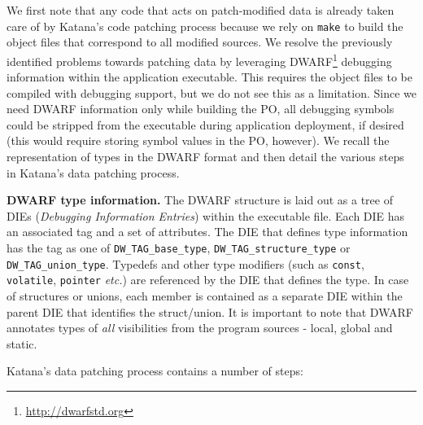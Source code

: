 We first note that any code that acts on patch-modified data is
already taken care of by Katana's code patching process
because we rely on {\tt make} to build the object files that
correspond to all modified sources. We resolve the previously
identified problems towards patching data by leveraging
DWARF\footnote{\url{http://dwarfstd.org}} debugging information within the
application executable. This requires the object files to be compiled
with debugging support, but we do not see this as a limitation. Since
we need DWARF information only while building the PO, all debugging
symbols could be stripped from the executable during application
deployment, if desired 
(this would require storing symbol values in the PO, however).
We recall the representation of types in
the DWARF format and then detail the various steps in Katana's data
patching process.

{\bf DWARF type information.} %
The DWARF structure is laid
out as a tree of DIEs ({\it Debugging Information Entries}) within the
executable file. Each DIE has an associated tag and a set of
attributes. The DIE that defines type information has the tag as one
of {\tt DW\_TAG\_base\_type}, {\tt DW\_TAG\_structure\_type} or {\tt
  DW\_TAG\_union\_type}. Typedefs and other type modifiers (such as
{\tt const}, {\tt volatile}, {\tt pointer} {\it etc.}) are referenced
by the DIE that defines the type. In case of structures or unions,
each member is contained as a separate DIE within the parent DIE that
identifies the struct/union. It is important to note that DWARF
annotates types of {\it all} visibilities from the program sources -
local, global and static.

Katana's data patching process contains a number of steps:

